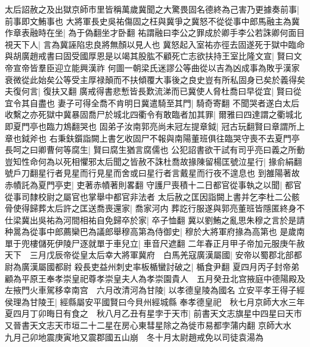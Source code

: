 太后詔赦之及出獄京師市里皆稱萬歲冀聞之大驚畏固名德終為己害乃更據奏前事|{
	前事即文鮪事也}
大將軍長史吳祐傷固之枉與冀爭之冀怒不從從事中郎馬融主為冀作章表融時在坐|{
	為于偽翻坐才卧翻}
祐謂融曰李公之罪成於卿手李公若誅卿何面目視天下人|{
	言為冀誣陷忠良將無顏以見人也}
冀怒起入室祐亦徑去固遂死于獄中臨命與胡廣趙戒書曰固受國厚恩是以竭其股肱不顧死亡志欲扶持王室比隆文宣|{
	賢曰文帝宣帝皆羣臣迎立能興漢祚}
何圖一朝梁氏迷謬公等曲從以吉為凶成事為敗乎漢家衰微從此始矣公等受主厚禄顛而不扶傾覆大事後之良史豈有所私固身已矣於義得矣夫復何言|{
	復扶又翻}
廣戒得書悲慙皆長歎流涕而已冀使人脅杜喬曰早從宜|{
	賢曰從宜令其自盡也}
妻子可得全喬不肯明日冀遣騎至其門|{
	騎奇寄翻}
不聞哭者遂白太后收繫之亦死獄中冀暴固喬尸於城北四衢令有敢臨者加其罪|{
	爾雅曰四達謂之衢城北即夏門亭也臨力鴆翻哭也}
固弟子汝南郭亮尚未冠左提章鉞|{
	冠古玩翻賢曰章謂所上章也鉞斧也}
右秉鈇鑕詣闕上書乞收固尸不報與南陽董班俱往臨哭守喪不去夏門亭長呵之曰卿曹何等腐生|{
	賢曰腐生猶言腐儒也}
公犯詔書欲干試有司乎亮曰義之所動豈知性命何為以死相懼邪太后聞之皆赦不誅杜喬故掾陳留楊匡號泣星行|{
	掾俞絹翻號戶刀翻星行者見星而行見星而舍或曰星行者言戴星而行夜不遑息也}
到雒陽著故赤幘託為夏門亭吏|{
	吏著赤幘著則畧翻}
守護尸喪積十二日都官從事執之以聞|{
	都官從事司隸校尉之屬官也掌舉中都官非法者}
太后赦之匡因詣闕上書并乞李杜二公骸骨使得歸葬太后許之匡送喬喪還家|{
	喬家河内}
葬訖行服遂與郭亮董班皆隱匿終身不仕梁冀出吳祐為河間相祐自免歸卒於家|{
	卒子恤翻}
冀以劉鮪之亂思朱穆之言於是請种暠為從事中郎薦欒巴為議郎舉穆高第為侍御史|{
	穆於大將軍府掾為高第也}
是歲南單于兜樓儲死伊陵尸逐就單于車兒立|{
	車音尺遮翻}
二年春正月甲子帝加元服庚午赦天下　三月戊辰帝從皇太后幸大將軍冀府　白馬羌寇廣漢屬國|{
	安帝以蜀郡北部都尉為廣漢屬國都尉}
殺長吏益州刺史率板楯蠻討破之|{
	楯食尹翻}
夏四月丙子封帝弟顧為平原王奉孝崇皇祀尊孝崇皇夫人為孝崇園貴人　五月癸丑北宫掖庭中德陽殿及左掖門火車駕移幸南宫　六月改清河為甘陵|{
	以孝德皇陵為國名}
立安平孝王得子經侯理為甘陵王|{
	經縣屬安平國賢曰今貝州經城縣}
奉孝德皇祀　秋七月京師大水三年夏四月丁卯晦日有食之　秋八月乙丑有星孛于天市|{
	前書天文志旗星中四星曰天市又晉書天文志天市垣二十二星在房心東彗星除之為徙市易都孛蒲内翻}
京師大水　九月己卯地震庚寅地又震郡國五山崩　冬十月太尉趙戒免以司徒袁湯為

